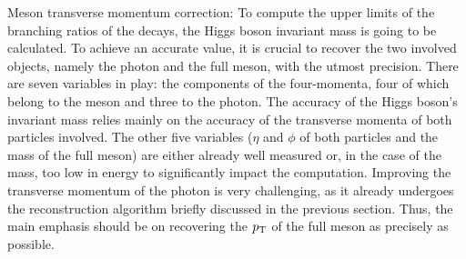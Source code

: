 \begin{myitemlist}

    \item[Meson transverse momentum correction:] To compute the upper limits of the branching ratios of the decays, the Higgs boson invariant mass is going to be calculated. To achieve an accurate value, it is crucial to recover the two involved objects, namely the photon and the full meson, with the utmost precision. There are seven variables in play: the components of the four-momenta, four of which belong to the meson and three to the photon. The accuracy of the Higgs boson's invariant mass relies mainly on the accuracy of the transverse momenta of both particles involved. The other five variables ($\eta$ and $\phi$ of both particles and the mass of the full meson) are either already well measured or, in the case of the mass, too low in energy to significantly impact the computation. Improving the transverse momentum of the photon is very challenging, as it already undergoes the reconstruction algorithm briefly discussed in the previous section. Thus, the main emphasis should be on recovering the $p_\text{T}$ of the full meson as precisely as possible.
    

\end{myitemlist}
